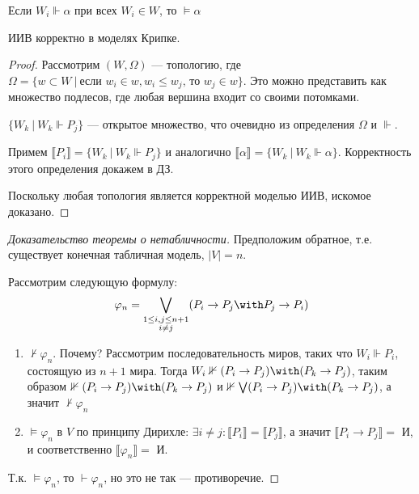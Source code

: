 \begin{definition}
    Если \(W_i \Vdash \alpha\) при всех \(W_i\in W\), то \(\models \alpha\)
\end{definition}

\begin{theorem}
    ИИВ корректно в моделях Крипке.
\end{theorem}
\begin{proof}
    Рассмотрим \((W, \Omega)\) --- топологию, где \(\Omega = \{w\subset W \ |\ \text{если } w_i \in w, w_i \leq w_j \text{, то } w_j\in w\} \). Это можно представить как множество подлесов, где любая вершина входит со своими потомками.

    \(\{W_k\ |\ W_k \Vdash P_j\}\) --- открытое множество, что очевидно из определения \(\Omega\) и \(\Vdash\).

    Примем \(\llbracket P_i \rrbracket = \{W_k\ |\ W_k\Vdash P_j\}\) и аналогично \(\llbracket \alpha \rrbracket = \{W_k\ |\ W_k \Vdash \alpha\}\). Корректность этого определения докажем в ДЗ.

    Поскольку любая топология является корректной моделью ИИВ, искомое доказано.
\end{proof}

\begin{proof}[Доказательство теоремы о нетабличности]
    Предположим обратное, т.е. существует конечная табличная модель, \(|V| = n\).

    Рассмотрим следующую формулу:
    \[\varphi_n = \bigvee_{\substack{ 1 \leq i, j \leq n + 1 \\ i \neq j}} (P_i \to P_j \with P_j \to P_i)\]

    \begin{enumerate}
        \item \(\nvdash\varphi_n\). Почему? Рассмотрим последовательность миров, таких что \(W_i \Vdash P_i\), состоящую из \(n + 1\) мира. Тогда \(W_i \nVdash (P_i \to P_j) \with (P_k \to P_j)\), таким образом \(\nVdash (P_i \to P_j) \with (P_k \to P_j)\) и \(\nVdash \bigvee (P_i \to P_j) \with (P_k \to P_j)\), а значит \(\nvdash \varphi_n\)
        \item \(\models \varphi_n\) в \(V\) по принципу Дирихле: \(\exists i \neq j : \llbracket P_i \rrbracket = \llbracket P_j \rrbracket\), а значит \(\llbracket P_i \to P_j \rrbracket = \) И, и соответственно \(\llbracket \varphi_n \rrbracket =\) И.
    \end{enumerate}

    Т.к. \(\models \varphi_n\), то \(\vdash \varphi_n\), но это не так --- противоречие.
\end{proof}

